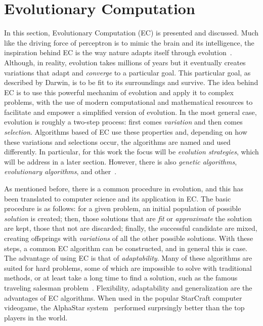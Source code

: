 \section{Evolutionary Computation}
In this section, Evolutionary Computation (EC) is presented and discussed. Much like the 
driving force of perceptron is to mimic the brain and its intelligence, the inspiration 
behind EC is the way nature adapts itself through 
evolution~\cite{fogelWhatEvolutionaryComputation2000}. Although, in reality, evolution 
takes millions of years but it eventually creates variations that adapt and \emph{converge} 
to a particular goal. This particular goal, as described by Darwin, is to be fit to its 
surroundings and survive. The idea behind EC is to use this powerful mechanim of evolution 
and apply it to complex problems, with the use of modern computational and mathematical 
resources to facilitate and empower a simplified version of evolution. In the most general 
case, evolution is roughly a two-step process: first comes \emph{variation} and then comes 
\emph{selection}. Algorithms based of EC use these properties and, depending on how these 
variations and selections occur, the algorithms are named and used differently. In 
particular, for this work the focus will be \emph{evolution strategies}, which will be 
address in a later section. However, there is also \emph{genetic algorithms}, 
\emph{evolutionary algorithms}, and other~\cite{kacprzykSpringerHandbookComputational2015}.

As mentioned before, there is a common procedure in evolution, and this has been translated 
to computer science and its application in EC. The basic procedure is as follows: for a 
given problem, an initial population of possible \emph{solution} is created; then, those 
solutions that are \emph{fit} or \emph{approximate} the solution are kept, those that not 
are discarded; finally, the successful candidate are mixed, creating offsprings with 
\emph{variations} of all the other possible solutions. With these steps, a common EC 
algorithm can be constructed, and in general this is case. The advantage of using EC is 
that of \emph{adaptability}. Many of these algorithms are suited for hard problems, some of 
which are impossible to solve with traditional methods, or at least take a long time to 
find a solution, such as the famous traveling salesman 
problem~\cite{dorigoAntColonySystem1997}. Flexibility, adaptability and generalization are 
the advantages of EC algorithms. When used in the popular StarCraft computer videogame, the 
AlphaStar system~\cite{arulkumaranAlphaStarEvolutionaryComputation2019} performed 
surprsingly better than the top players in the world. 

